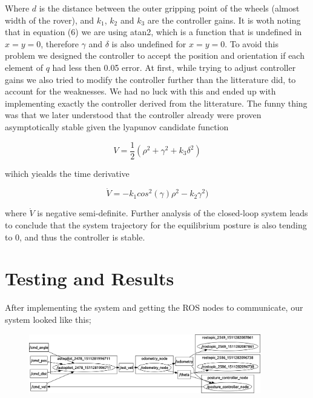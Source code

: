 \documentclass[a4paper,10pt]{article}
\begin{document}
		Where $d$ is the distance between the outer gripping point of the wheels (almost width of the rover), and $k_{1}$, $k_{2}$ and $k_{3}$ are the controller gains.
		It is woth noting that in equation (6) we are using atan2, which is a function that is undefined in $x=y=0$, therefore $\gamma$ and $\delta$ is also undefined for $x=y=0$.
		To avoid this problem we designed the controller to accept the position and orientation if each element of $q$ had less then 0.05 error. At first, while trying to adjust controller gains 
		we also tried to modify the controller further than the litterature did, to account for the weaknesses. We had no luck with this and ended up with implementing exactly the controller
		derived from the litterature. The funny thing was that we later understood that the controller already were proven asymptotically stable given the lyapunov candidate function

		\begin{equation}
			V = \frac{1}{2}(\rho^2 + \gamma^2 + k_{3}\delta^2)
		\end{equation}

		wihich yiealds the time derivative

		\begin{equation}
			\dot{V} = - k_{1}cos^2(\gamma)\rho^2 - k_{2}\gamma^2)
		\end{equation}

		where $\dot{V}$ is negative semi-definite. Further analysis of the closed-loop system leads to conclude that the system trajectory for the equilibrium posture is also tending to 0, 
		and thus the controller is stable.


\section{Testing and Results}

		After implementing the system and getting the ROS nodes to communicate, our system looked like this;

		\begin{figure}[H]
		\centering
		\includegraphics[width=0.9\textwidth]{rover2_rqt_graph.png}
		\end{figure}
\end{document}
